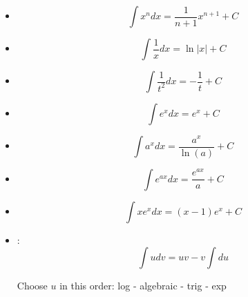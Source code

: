 \begin{multicols*}{3}


    \begin{itemize}
      \item \[\int x^n dx = \frac{1}{n + 1} x^{n + 1} + C \]
      \item \[\int \frac{1}{x} dx = \ln|x| + C \]
      \item \[\int \frac{1}{t^2} dx = - \frac{1}{t} + C\]
      \item \[\int e^x dx = e^x + C\]
      \item \[\int a^x dx = \frac{a^x}{\ln(a)} + C\]
      \item \[\int e^{ax} dx = \frac{e^{ax}}{a} + C\]
      \item \[\int x e^x dx = (x - 1)e^x + C\]
      \item {}:
        \[
          \int udv = uv - v \int du
        \]
        \par Choose $u$ in this order: log - algebraic - trig - exp
    \end{itemize}

\end{multicols*}
